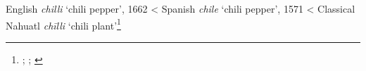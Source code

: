 \begin{etymology}\label{ety:chili}
English \textit{chilli} `chili pepper', 1662
< Spanish \textit{chile} `chili pepper', 1571
< Classical Nahuatl \textit{chīlli} `chili plant'\footnote{\textcite[s.v. chilli]{oed}; \textcite[s.v. chile]{dle}; \textcite[s.v. chilli]{ond}}
\end{etymology}